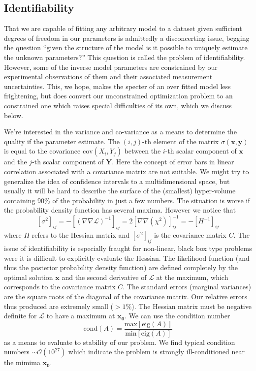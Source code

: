 \documentclass[10pt,a4paper]{article}
\begin{document}
\subsection{Identifiability}
That we are capable of fitting any arbitrary model to a dataset given sufficient degrees of freedom in our parameters is admittedly a disconcerting issue, begging the question ``given the structure of the model is it possible to uniquely estimate the unknown parameters?'' This question is called the problem of identifiability. However, some of the inverse model parameters are constrained by our experimental observations of them and their associated measurement uncertainties. This, we hope, makes the specter of an over fitted model less frightening, but does convert our unconstrained optimization problem to an constrained one which raises special difficulties of its own, which we discuss below. 

We're interested in the variance and co-variance as a means to determine the quality if the parameter estimate. The $\left( i, j \right)$-th element of the matrix $\sigma (\mathbf{x}, \mathbf{y})$ is equal to the covariance $\mbox{cov}(X_i, Y_j)$ between the $i$-th scalar component of $\mathbf{x}$ and the $j$-th scalar component of $\mathbf{Y}$. Here the concept of error bars in linear correlation associated with a covariance matrix are not suitable. We might try to generalize the idea of confidence intervals to a multidimensional space, but usually it will be hard to describe the surface of the (smallest) hyper-volume containing 90\% of the probability in just a few numbers. The situation is worse if the probability density function has several maxima. However we notice that 
\[ \left[\sigma^2 \right]_{ij} = -\left[ \left( \nabla \nabla \mathcal{L}\right)^{-1}\right]_{ij} = 2 \left[ \nabla \nabla \left( \chi^2\right)\right]_{ij}^{-1} = -\left[H^{-1} \right]_{ij}\]
where $H$ refers to the Hessian matrix and $\left[\sigma^2 \right]_{ij}$ is the covariance matrix $C$. The issue of identifiability is especially fraught for non-linear, black box type problems were it is difficult to explicitly evaluate the Hessian. 
The likelihood function (and thus the posterior probability density function) are defined completely by the optimal solution $\mathbf{x}$ and the second derivative of $\mathcal{L}$ at the maximum, which corresponds to the covariance matrix $C$. The standard errors (marginal variances) are the square roots of the diagonal of the covariance matrix. Our relative errors thus produced are extremely small ($> 1 \%$). The Hessian matrix must be negative definite for $\mathcal{L}$ to have a maximum at $\mathbf{x_0}$. We can use the condition number
\[ \mbox{cond} (A) = \frac{\mbox{max}[\mbox{eig}(A)]}{\mbox{min}[\mbox{eig}(A)]} \]
as a means to evaluate to stability of our problem. We find typical condition numbers $\sim \mathcal{O}(10^{27})$ which indicate the problem is strongly ill-conditioned near the mimima $\mathbf{x_0}$.   
\end{document}
